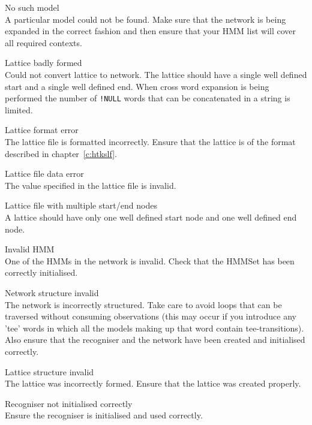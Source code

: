 \begin{itemize}
\begin{itemize}
    No such model\\
        A particular model could not be found.  Make sure that the network is
        being expanded in the correct fashion and then ensure that your HMM
        list will cover all required contexts.

    Lattice badly formed\\
        Could not convert lattice to network.  The lattice should have a single
        well defined start and a single well defined end.  When cross word 
        expansion is being performed the number of \texttt{!NULL} words that 
        can be concatenated in a string is limited.

    Lattice format error\\
        The lattice file is formatted incorrectly.  Ensure that the lattice
        is of the format described in chapter~\ref{c:htkslf}.

    Lattice file data error\\
        The value specified in the lattice file is invalid.

    Lattice file with multiple start/end nodes\\
        A lattice should have only one well defined start node and one
        well defined end node.

\end{itemize}


\begin{itemize}
 Invalid HMM\\
        One of the HMMs in the network is invalid.  Check that the HMMSet
        has been correctly initialised.

    Network structure invalid\\
        The network is incorrectly structured.  Take care to avoid loops
        that can be traversed without consuming observations (this may occur 
        if you introduce any 'tee' words in which all the models making up that
        word contain tee-transitions).  Also ensure that the recogniser and
        the network have been created and initialised correctly.

    Lattice structure invalid\\
        The lattice was incorrectly formed.  Ensure that the lattice was
        created properly.

 Recogniser not initialised correctly\\
        Ensure the recogniser is initialised and used correctly.


\end{itemize}
\end{itemize}
